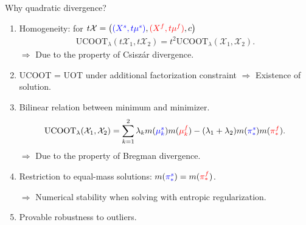 \documentclass{beamer}
\newcommand{\ucoot}{\text{UCOOT}}
\newcommand{\cX}{\mathcal X}
\begin{document}
\begin{frame}{Why quadratic divergence?}
  \scriptsize
  \vspace{-1cm}
\begin{enumerate}
  \item Homogeneity:
  for $t\cX = \left({\color{blue}{(X^s, t\mu^s)}}, {\color{red}{(X^f, t\mu^f)}}, c \right)$
  \begin{align*}
    \ucoot_{\lambda}(t\cX_1, t\cX_2) = t^2 \ucoot_{\lambda}(\cX_1, \cX_2).
  \end{align*}
  $\Rightarrow$ Due to the property of Csiszár divergence.

  \item UCOOT = UOT under additional factorization constraint
  $\Rightarrow$ Existence of solution.

  \item Bilinear relation between minimum and minimizer.
  \begin{align*}
    \ucoot_{\lambda}(\cX_1, \cX_2) =
    \sum_{k=1}^2 \lambda_k m({\color{blue}{\mu_k^s}}) m({\color{red}{\mu_k^f}})
    - (\lambda_1 + \lambda_2) m({\color{blue}{\pi^s_*}}) m({\color{red}{\pi^f_*}}).
  \end{align*}
  $\Rightarrow$ Due to the property of Bregman divergence.

  \item Restriction to equal-mass solutions: $m({\color{blue}{\pi^s_*}}) = m({\color{red}{\pi^f_*}})$.

  $\Rightarrow$ Numerical stability when solving with entropic regularization.

  \item Provable robustness to outliers.
\end{enumerate}


\end{frame}
\end{document}
